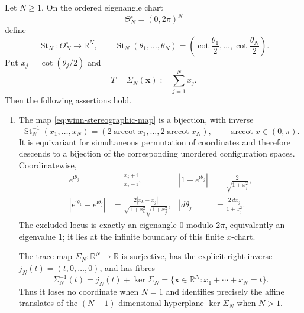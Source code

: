 \begin{theorem}
\label{thm:winn-forrester-terminal-state}
Let $N\geq1$.  On the ordered eigenangle chart
\[
 \Theta_N^\circ=(0,2\pi)^N
\]
define
\begin{equation}
 \operatorname{St}_N:\Theta_N^\circ\longrightarrow\mathbb R^N,
 \qquad
 \operatorname{St}_N(\theta_1,\ldots,\theta_N)
 =\left(\cot\frac{\theta_1}{2},\ldots,\cot\frac{\theta_N}{2}\right).
 \label{eq:winn-stereographic-map}
\end{equation}
Put $x_j=\cot(\theta_j/2)$ and
\[
 T=\Sigma_N(\mathbf x):=\sum_{j=1}^{N}x_j.
\]
Then the following assertions hold.

\begin{enumerate}
 \item The map \eqref{eq:winn-stereographic-map} is a bijection, with inverse
 \begin{equation}
  \operatorname{St}_N^{-1}(x_1,\ldots,x_N)
  =\left(2\operatorname{arccot}x_1,\ldots,
  2\operatorname{arccot}x_N\right),
  \qquad \operatorname{arccot}x\in(0,\pi).
  \label{eq:winn-stereographic-inverse}
 \end{equation}
 It is equivariant for simultaneous permutation of coordinates and therefore descends
 to a bijection of the corresponding unordered configuration spaces.  Coordinatewise,
 \begin{align}
  e^{\mathrm i\theta_j}&=\frac{x_j+\mathrm i}{x_j-\mathrm i},
  &|1-e^{\mathrm i\theta_j}|&=\frac{2}{\sqrt{1+x_j^2}},
  \label{eq:winn-stereographic-point-identities}\\
  |e^{\mathrm i\theta_k}-e^{\mathrm i\theta_j}|
  &=\frac{2|x_k-x_j|}
  {\sqrt{1+x_k^2}\sqrt{1+x_j^2}},
  &|d\theta_j|&=\frac{2\,dx_j}{1+x_j^2}.
  \label{eq:winn-stereographic-jacobian-identities}
 \end{align}
 The excluded locus is exactly an eigenangle $0$ modulo $2\pi$, equivalently an
 eigenvalue $1$; it lies at the infinite boundary of this finite $x$-chart.

 The trace map $\Sigma_N:\mathbb R^N\to\mathbb R$ is surjective, has the explicit
 right inverse $j_N(t)=(t,0,\ldots,0)$, and has fibres
 \begin{equation}
  \Sigma_N^{-1}(t)=j_N(t)+\ker\Sigma_N
  =\{\mathbf x\in\mathbb R^N:x_1+\cdots+x_N=t\}.
  \label{eq:winn-trace-fibres}
 \end{equation}
 Thus it loses no coordinate when $N=1$ and identifies precisely the affine translates
 of the $(N-1)$-dimensional hyperplane $\ker\Sigma_N$ when $N>1$.


\end{enumerate}
\end{theorem}
